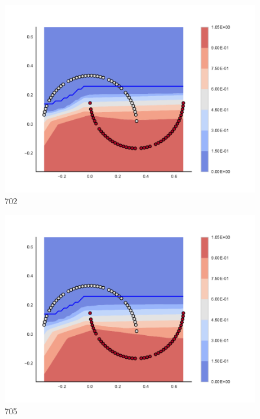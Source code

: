 \begin{subfigure}[b]{0.09\textwidth}
    \includegraphics[clip, trim=2.35cm 1.75cm 4.5cm 0cm,width=\textwidth]{img/convergence/702.pdf}
    \caption{702}
    \label{fig:convergence_702}
\end{subfigure}
%
\begin{subfigure}[b]{0.09\textwidth}
    \includegraphics[clip, trim=2.35cm 1.75cm 4.5cm 0cm,width=\textwidth]{img/convergence/705.pdf}
    \caption{705}
    \label{fig:convergence_705}
\end{subfigure}
%
